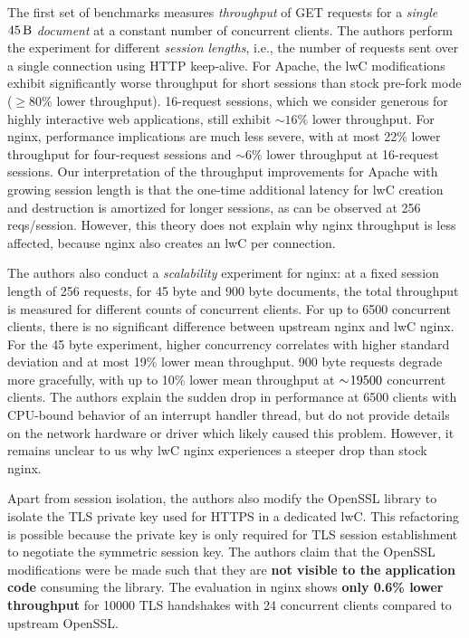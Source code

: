 \documentclass[10pt,twocolumn,a4paper]{article}
\begin{document}
The first set of benchmarks measures \textit{throughput} of GET requests for a \textit{single $\SI{45}{\byte}$ document} at a constant number of concurrent clients.
The authors perform the experiment for different \textit{session lengths}, i.e., the number of requests sent over a single connection using HTTP keep-alive.
For Apache, the lwC modifications exhibit significantly worse throughput for short sessions than stock pre-fork mode ($\ge80\%$ lower throughput).
16-request sessions, which we consider generous for highly interactive web applications, still exhibit $\sim 16\%$ lower throughput.
For nginx, performance implications are much less severe, with at most 22\% lower throughput for four-request sessions and $\sim 6\%$ lower throughput at 16-request sessions.
Our interpretation of the throughput improvements for Apache with growing session length is that the one-time additional latency for lwC creation and destruction is amortized for longer sessions, as can be observed at 256 reqs/session.
However, this theory does not explain why nginx throughput is less affected, because nginx also creates an lwC per connection.
\cite{lwcpaper}

The authors also conduct a \textit{scalability} experiment for nginx:
at a fixed session length of 256 requests, for 45 byte and 900 byte documents, the total throughput is measured for different counts of concurrent clients.
For up to 6500 concurrent clients, there is no significant difference between upstream nginx and lwC nginx.
For the 45 byte experiment, higher concurrency correlates with higher standard deviation and at most 19\% lower mean throughput.
900 byte requests degrade more gracefully, with up to 10\% lower mean throughput at $\sim\hspace{-2pt}19500$ concurrent clients.
The authors explain the sudden drop in performance at 6500 clients with CPU-bound behavior of an interrupt handler thread, but do not provide details on the network hardware or driver which likely caused this problem.
However, it remains unclear to us why lwC nginx experiences a steeper drop than stock nginx.
\cite{lwcpaper}

Apart from session isolation, the authors also modify the OpenSSL library to isolate the TLS private key used for HTTPS in a dedicated lwC.
This refactoring is possible because the private key is only required for TLS session establishment to negotiate the symmetric session key.
The authors claim that the OpenSSL modifications were be made such that they are \textbf{not visible to the application code} consuming the library.
The evaluation in nginx shows \textbf{only 0.6\% lower throughput} for 10000 TLS handshakes with 24 concurrent clients compared to upstream OpenSSL.
\cite{lwcpaper}
\end{document}
